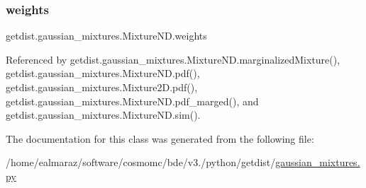 \subsubsection{\texorpdfstring{weights}{weights}}
{\footnotesize\ttfamily getdist.\+gaussian\+\_\+mixtures.\+Mixture\+N\+D.\+weights}



Referenced by getdist.\+gaussian\+\_\+mixtures.\+Mixture\+N\+D.\+marginalized\+Mixture(), getdist.\+gaussian\+\_\+mixtures.\+Mixture\+N\+D.\+pdf(), getdist.\+gaussian\+\_\+mixtures.\+Mixture2\+D.\+pdf(), getdist.\+gaussian\+\_\+mixtures.\+Mixture\+N\+D.\+pdf\+\_\+marged(), and getdist.\+gaussian\+\_\+mixtures.\+Mixture\+N\+D.\+sim().



The documentation for this class was generated from the following file\+:\begin{DoxyCompactItemize}
\item 
/home/ealmaraz/software/cosmomc/bde/v3./python/getdist/\mbox{\hyperlink{gaussian__mixtures_8py}{gaussian\+\_\+mixtures.\+py}}\end{DoxyCompactItemize}
